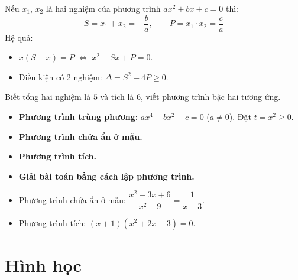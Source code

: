 \documentclass[12pt,a4paper]{article}
\begin{document}
\begin{dinhly}[title={Định lý Vi-ét}]
  Nếu $x_1,\, x_2$ là hai nghiệm của phương trình $ax^2 + bx + c = 0$ thì:
  \[S = x_1 + x_2 = -\frac{b}{a}, \qquad P = x_1 \cdot x_2 = \frac{c}{a}\]
  Hệ quả:
  \begin{itemize}
    \item $x(S - x) = P \;\Leftrightarrow\; x^2 - Sx + P = 0$.
    \item Điều kiện có 2 nghiệm: $\Delta = S^2 - 4P \ge 0$.
  \end{itemize}
\end{dinhly}

\begin{vidu}
  Biết tổng hai nghiệm là $5$ và tích là $6$, viết phương trình bậc hai tương ứng.
\end{vidu}

\begin{phuongphap}[title={Các dạng phương trình đặc biệt}]
  \begin{itemize}
    \item \textbf{Phương trình trùng phương:} $ax^4 + bx^2 + c = 0$ \quad ($a \neq 0$). Đặt $t = x^2 \ge 0$.
    \item \textbf{Phương trình chứa ẩn ở mẫu.}
    \item \textbf{Phương trình tích.}
    \item \textbf{Giải bài toán bằng cách lập phương trình.}
  \end{itemize}
\end{phuongphap}

\begin{vidu}
  \begin{itemize}
    \item Phương trình chứa ẩn ở mẫu: $\dfrac{x^2 - 3x + 6}{x^2 - 9} = \dfrac{1}{x - 3}$.
    \item Phương trình tích: $(x + 1)(x^2 + 2x - 3) = 0$.
  \end{itemize}
\end{vidu}


\section{Hình học}

\end{document}

